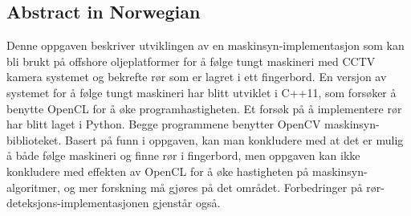 \subsection*{Abstract in Norwegian}
Denne oppgaven beskriver utviklingen av en maskinsyn-implementasjon som kan bli brukt på offshore oljeplatformer for å følge tungt maskineri med CCTV kamera systemet og bekrefte rør som er lagret i ett fingerbord. En versjon av systemet for å følge tungt maskineri har blitt utviklet i C++11, som forsøker å benytte OpenCL for å øke programhastigheten. Et forsøk på å implementere rør har blitt laget i Python. Begge programmene benytter OpenCV maskinsyn-biblioteket. Basert på funn i oppgaven, kan man konkludere med at det er mulig å både følge maskineri og finne rør i fingerbord, men oppgaven kan ikke konkludere med effekten av OpenCL for å øke hastigheten på maskinsyn-algoritmer, og mer forskning må gjøres på det området. Forbedringer på rør-deteksjons-implementasjonen gjenstår også.
\newpage